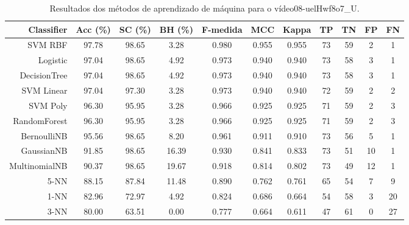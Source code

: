 \begin{table}[!htb]
\centering
\caption{Resultados dos métodos de aprendizado de máquina para o vídeo08-uelHwf8o7_U.}
\label{tab:08-uelHwf8o7_U}
\begin{tabular}{r|c|c|c|c|c|c|c|c|c|c}
\hline\hline
Classifier & Acc (\%) & SC (\%) & BH (\%) & F-medida & MCC & Kappa & TP & TN & FP & FN \\ \hline
SVM RBF & 97.78 & 98.65 & 3.28 & 0.980 & 0.955 & 0.955 & 73 & 59 & 2 & 1 \\ 
Logistic & 97.04 & 98.65 & 4.92 & 0.973 & 0.940 & 0.940 & 73 & 58 & 3 & 1 \\ 
DecisionTree & 97.04 & 98.65 & 4.92 & 0.973 & 0.940 & 0.940 & 73 & 58 & 3 & 1 \\ 
SVM Linear & 97.04 & 97.30 & 3.28 & 0.973 & 0.940 & 0.940 & 72 & 59 & 2 & 2 \\ 
SVM Poly & 96.30 & 95.95 & 3.28 & 0.966 & 0.925 & 0.925 & 71 & 59 & 2 & 3 \\ 
RandomForest & 96.30 & 95.95 & 3.28 & 0.966 & 0.925 & 0.925 & 71 & 59 & 2 & 3 \\ 
BernoulliNB & 95.56 & 98.65 & 8.20 & 0.961 & 0.911 & 0.910 & 73 & 56 & 5 & 1 \\ 
GaussianNB & 91.85 & 98.65 & 16.39 & 0.930 & 0.841 & 0.833 & 73 & 51 & 10 & 1 \\ 
MultinomialNB & 90.37 & 98.65 & 19.67 & 0.918 & 0.814 & 0.802 & 73 & 49 & 12 & 1 \\ 
5-NN & 88.15 & 87.84 & 11.48 & 0.890 & 0.762 & 0.761 & 65 & 54 & 7 & 9 \\ 
1-NN & 82.96 & 72.97 & 4.92 & 0.824 & 0.686 & 0.664 & 54 & 58 & 3 & 20 \\ 
3-NN & 80.00 & 63.51 & 0.00 & 0.777 & 0.664 & 0.611 & 47 & 61 & 0 & 27 \\ 
\hline\hline
\end{tabular}
\end{table}
